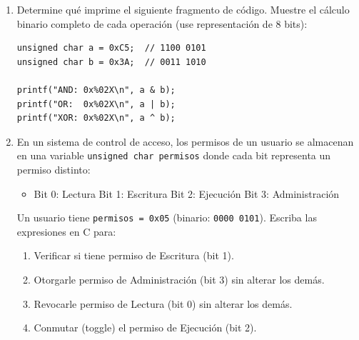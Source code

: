 \documentclass[11pt,letterpaper]{article}
\begin{document}
\begin{enumerate}[label=\textbf{\arabic*.}]
    \begin{enumerate}[label=(\alph*)]
        \item Determine qué imprime el siguiente fragmento de código. Muestre el cálculo binario completo de cada operación (use representación de 8 bits):
        \begin{lstlisting}[style=customc]
unsigned char a = 0xC5;  // 1100 0101
unsigned char b = 0x3A;  // 0011 1010

printf("AND: 0x%02X\n", a & b);
printf("OR:  0x%02X\n", a | b);
printf("XOR: 0x%02X\n", a ^ b);
        \end{lstlisting}

        \item En un sistema de control de acceso, los permisos de un usuario se almacenan en una variable \texttt{unsigned char permisos} donde cada bit representa un permiso distinto:
        \begin{itemize}[noitemsep]
            \item Bit 0: Lectura \quad Bit 1: Escritura \quad Bit 2: Ejecución \quad Bit 3: Administración
        \end{itemize}
        Un usuario tiene \texttt{permisos = 0x05} (binario: \texttt{0000 0101}). Escriba las expresiones en C para:
        \begin{enumerate}[label=\arabic*., noitemsep]
            \item Verificar si tiene permiso de Escritura (bit 1).
            \item Otorgarle permiso de Administración (bit 3) sin alterar los demás.
            \item Revocarle permiso de Lectura (bit 0) sin alterar los demás.
            \item Conmutar (toggle) el permiso de Ejecución (bit 2).
        \end{enumerate}

       
    \end{enumerate}

\end{enumerate}
\end{document}
